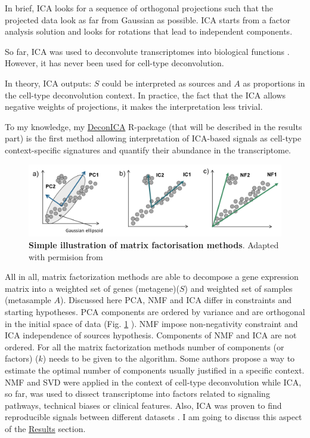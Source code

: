 \documentclass[12pt,]{book}
\theoremstyle{definition}
\theoremstyle{definition}
\theoremstyle{definition}
\theoremstyle{remark}
\begin{document}
In brief, ICA looks for a sequence of orthogonal projections such that
the projected data look as far from Gaussian as possible. ICA starts
from a factor analysis solution and looks for rotations that lead to
independent components.

So far, ICA was used to deconvolute transcriptomes into biological
functions
\citep{Biton2014, Engreitz2010, Gorban2007, Teschendorff2007, Zinovyev2013}.
However, it has never been used for cell-type deconvolution.

In theory, ICA outputs: \(S\) could be interpreted as sources and \(A\)
as proportions in the cell-type deconvolution context. In practice, the
fact that the ICA allows negative weights of projections, it makes the
interpretation less trivial.

To my knowledge, my \protect\hyperlink{DeconICA}{DeconICA} R-package
(that will be described in the results part) is the first method
allowing interpretation of ICA-based signals as cell-type
context-specific signatures and quantify their abundance in the
transcriptome.

\begin{figure}

{\centering \includegraphics[width=0.8\linewidth]{figures-ext/bss} 

}

\caption[Simple illustration of matrix factorisation methods]{\textbf{Simple illustration of matrix
factorisation methods}. Adapted with permision from \citep{Zinovyev2013}}\label{fig:matrixfact}
\end{figure}




All in all, matrix factorization methods are able to decompose a gene
expression matrix into a weighted set of genes (metagene)(\(S\)) and
weighted set of samples (metasample \(A\)). Discussed here PCA, NMF and
ICA differ in constraints and starting hypotheses. PCA components are
ordered by variance and are orthogonal in the initial space of data
(Fig. \ref{fig:matrixfact} ). NMF impose non-negativity constraint and
ICA independence of sources hypothesis. Components of NMF and ICA are
not ordered. For all the matrix factorization methods number of
components (or factors) (\(k\)) needs to be given to the algorithm. Some
authors propose a way to estimate the optimal number of components
usually justified in a specific context. NMF and SVD were applied in the
context of cell-type deconvolution while ICA, so far, was used to
dissect transcriptome into factors related to signaling pathways,
technical biases or clinical features. Also, ICA was proven to find
reproducible signals between different datasets
\citep{Cantini2018, Teschendorff2007}. I am going to discuss this aspect
of the \protect\hyperlink{results-1}{Results} section.
\end{document}

